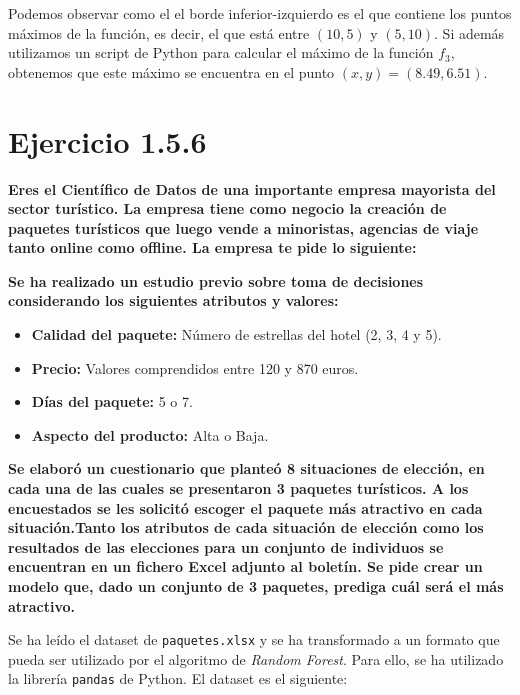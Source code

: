 \documentclass[12pt, letterpaper]{article}
\begin{document}
Podemos observar como el el borde inferior-izquierdo es el que contiene los puntos máximos de la función, es decir, el que está entre $(10,5)$ y $(5,10)$. Si además utilizamos un script de Python para calcular el máximo de la función $f_3$, obtenemos que este máximo se encuentra en el punto $(x,y) = (8.49, 6.51)$.

\newpage

\section{Ejercicio 1.5.6}
\textbf{Eres el Científico de Datos de una importante empresa mayorista del sector turístico. La empresa tiene como negocio la creación de paquetes turísticos que luego vende a minoristas, agencias de viaje tanto online como offline. La empresa te pide lo siguiente:}

\textbf{Se ha realizado un estudio previo sobre toma de decisiones considerando los siguientes atributos y valores:}
\begin{itemize}
    \item \textbf{Calidad del paquete:} Número de estrellas del hotel (2, 3, 4 y 5).
    \item \textbf{Precio:} Valores comprendidos entre 120 y 870 euros.
    \item \textbf{Días del paquete:} 5 o 7.
    \item \textbf{Aspecto del producto:} Alta o Baja.
\end{itemize}

\textbf{Se elaboró un cuestionario que planteó 8 situaciones de elección, en cada una de las cuales se presentaron 3 paquetes turísticos. A los encuestados se les solicitó escoger el paquete más atractivo en cada situación.Tanto los atributos de cada situación de elección como los resultados de las elecciones para un conjunto de individuos se encuentran en un fichero Excel adjunto al boletín. Se pide crear un modelo que, dado un conjunto de 3 paquetes, prediga cuál será el más atractivo.}

Se ha leído el dataset de \texttt{paquetes.xlsx} y se ha transformado a un formato que pueda ser utilizado por el algoritmo de \textit{Random Forest}. Para ello, se ha utilizado la librería \texttt{pandas} de Python. El dataset es el siguiente:
\end{document}
